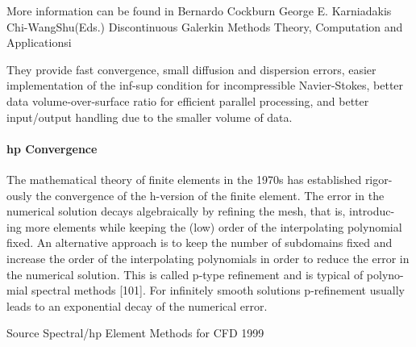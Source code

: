 More information can be found in 
Bernardo Cockburn
George E. Karniadakis
Chi-WangShu(Eds.)
Discontinuous
Galerkin Methods
Theory, Computation
and Applicationsi


They provide fast convergence, small
diffusion and dispersion errors, easier implementation of the inf-sup condition for
incompressible Navier-Stokes, better data volume-over-surface ratio for efficient
parallel processing, and better input/output handling due to the smaller volume
of data.


\paragraph{hp Convergence}
The mathematical theory of finite elements in the 1970s has established rigor-
ously the convergence of the h-version of the finite element. The error in the
numerical solution decays algebraically by refining the mesh, that is, introduc-
ing more elements while keeping the (low) order of the interpolating polynomial
fixed. An alternative approach is to keep the number of subdomains fixed and
increase the order of the interpolating polynomials in order to reduce the error in
the numerical solution. This is called p-type refinement and is typical of polyno-
mial spectral methods [101]. For infinitely smooth solutions p-refinement usually
leads to an exponential decay of the numerical error.

Source Spectral/hp Element Methods for CFD 1999



